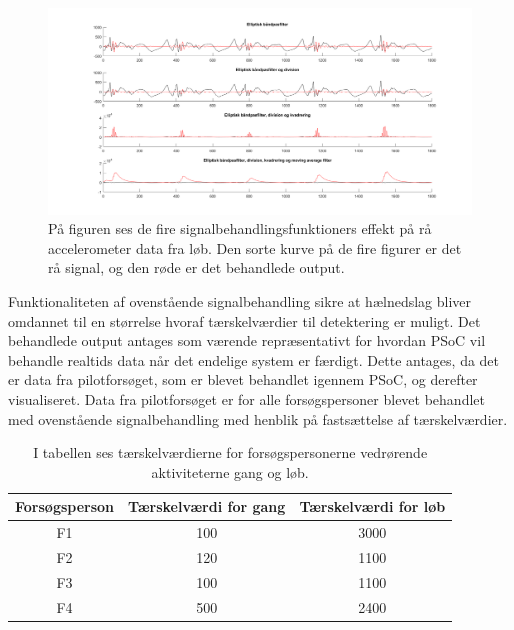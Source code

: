 \begin{figure}[H]
	\centering
	\includegraphics[scale=0.3]{figures/cDesign/signalbehandling_psoc.png}
	\caption{På figuren ses de fire signalbehandlingsfunktioners effekt på rå accelerometer data fra løb. Den sorte kurve på de fire figurer er det rå signal, og den røde er det behandlede output.}
	\label{fig:algoritme_cykling}
\end{figure}

Funktionaliteten af ovenstående signalbehandling sikre at hælnedslag bliver omdannet til en størrelse hvoraf tærskelværdier til detektering er muligt. Det behandlede output antages som værende repræsentativt for hvordan PSoC vil behandle realtids data når det endelige system er færdigt. Dette antages, da det er data fra pilotforsøget, som er blevet behandlet igennem PSoC, og derefter visualiseret. Data fra pilotforsøget er for alle forsøgspersoner blevet behandlet med ovenstående signalbehandling med henblik på fastsættelse af tærskelværdier. 

\begin{table}[H]
	\centering
	\begin{tabular}{ccc}
		\hline
		\rowcolor[HTML]{C0C0C0} 
		Forsøgsperson & Tærskelværdi for gang & Tærskelværdi for løb \\ \hline
		\rowcolor[HTML]{FFFFFF} 
		F1 & 100 & 3000 \\ \hline
		\rowcolor[HTML]{FFFFFF} 
		F2 & 120 & 1100 \\ \hline
		\rowcolor[HTML]{FFFFFF} 
		F3 & 100 & 1100 \\ \hline
		\rowcolor[HTML]{FFFFFF} 
		F4 & 500 & 2400 \\ \hline
	\end{tabular}
	\caption{I tabellen ses tærskelværdierne for forsøgspersonerne vedrørende aktiviteterne gang og løb.}
	\label{tab:individuel_taerskel}
\end{table}
  
